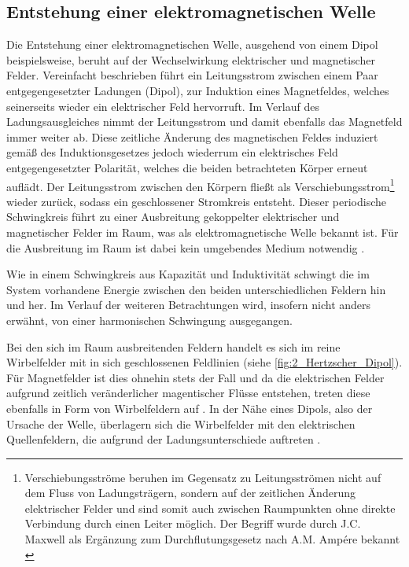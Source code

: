
\subsection{Entstehung einer elektromagnetischen Welle}\label{cha:2_sub_Entstehung_einer_Welle}

Die Entstehung einer elektromagnetischen Welle, ausgehend von einem Dipol beispielsweise, beruht auf der Wechselwirkung elektrischer und magnetischer Felder. Vereinfacht beschrieben führt ein Leitungsstrom zwischen einem Paar entgegengesetzter Ladungen (Dipol), zur Induktion eines Magnetfeldes, welches seinerseits wieder ein elektrischer Feld hervorruft. Im Verlauf des Ladungsausgleiches nimmt der Leitungsstrom und damit ebenfalls das Magnetfeld immer weiter ab. Diese zeitliche Änderung des magnetischen Feldes induziert gemäß des Induktionsgesetzes jedoch wiederrum ein elektrisches Feld entgegengesetzter Polarität, welches die beiden betrachteten Körper erneut auflädt. Der Leitungsstrom zwischen den Körpern fließt als Verschiebungsstrom\footnote{Verschiebungsströme beruhen im Gegensatz zu Leitungsströmen nicht auf dem Fluss von Ladungsträgern, sondern auf der zeitlichen Änderung elektrischer Felder und sind somit auch zwischen Raumpunkten ohne direkte Verbindung durch einen Leiter möglich. Der Begriff wurde durch J.C. Maxwell als Ergänzung zum Durchflutungsgesetz nach A.M. Ampére bekannt \cite{Feldtheorie_Begriffe}} wieder zurück, sodass ein geschlossener Stromkreis entsteht. Dieser periodische Schwingkreis führt zu einer Ausbreitung gekoppelter elektrischer und magnetischer Felder im Raum, was als elektromagnetische Welle bekannt ist. Für die Ausbreitung im Raum ist dabei kein umgebendes Medium notwendig \cite{EM_Schirmung}.
\par
\vspace{\linespace}
Wie in einem Schwingkreis aus Kapazität und Induktivität schwingt die im System vorhandene Energie zwischen den beiden unterschiedlichen Feldern hin und her. Im Verlauf der weiteren Betrachtungen wird, insofern nicht anders erwähnt, von einer harmonischen Schwingung ausgegangen.
\par
\vspace{\linespace}
Bei den sich im Raum ausbreitenden Feldern handelt es sich im reine Wirbelfelder mit in sich geschlossenen Feldlinien \cite{Feldtheorie_Begriffe} (siehe \Abb \ref{fig:2_Hertzscher_Dipol}). Für Magnetfelder ist dies ohnehin stets der Fall und da die elektrischen Felder aufgrund zeitlich veränderlicher magentischer Flüsse entstehen, treten diese ebenfalls in Form von Wirbelfeldern auf \cite{EM_Schirmung} \cite{Feldtheorie_Begriffe}. In der Nähe eines Dipols, also der Ursache der Welle, überlagern sich die Wirbelfelder mit den elektrischen Quellenfeldern, die aufgrund der Ladungsunterschiede auftreten \cite{EM_Schirmung}. 

